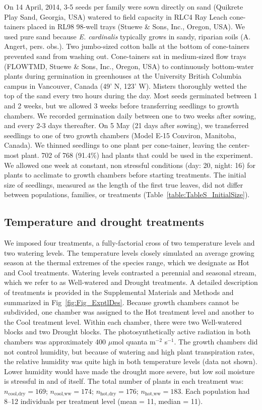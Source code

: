 \documentclass[11pt, oneside]{article}
\begin{document}
On 14 April, 2014, 3-5 seeds per family were sown directly on sand (Quikrete Play Sand, Georgia, USA) watered to field capacity in RLC4 Ray Leach cone-tainers placed in RL98 98-well trays (Stuewe \& Sons, Inc., Oregon, USA). We used pure sand because \textit{E. cardinalis} typically grows in sandy, riparian soils (A. Angert, pers. obs.). Two jumbo-sized cotton balls at the bottom of cone-tainers prevented sand from washing out. Cone-tainers sat in medium-sized flow trays (FLOWTMD, Stuewe \& Sons, Inc., Oregon, USA) to continuously bottom-water plants during germination in greenhouses at the University British Columbia campus in Vancouver, Canada (49' N, 123' W). Misters thoroughly wetted the top of the sand every two hours during the day. Most seeds germinated between 1 and 2 weeks, but we allowed 3 weeks before transferring seedlings to growth chambers. We recorded germination daily between one to two weeks after sowing, and every 2-3 days thereafter. On 5 May (21 days after sowing), we transferred seedlings to one of two growth chambers (Model E-15 Conviron, Manitoba, Canada). We thinned seedlings to one plant per cone-tainer, leaving the center-most plant. 702 of 768 (91.4\%) had plants that could be used in the experiment. We allowed one week at constant, non stressful conditions (day: 20\celsius, night: 16\celsius) for plants to acclimate to growth chambers before starting treatments. The initial size of seedlings, measured as the length of the first true leaves, did not differ between populations, families, or treatments (Table~\ref{table:TableS_InitialSize}).
    
\subsection*{Temperature and drought treatments}

We imposed four treatments, a fully-factorial cross of two temperature levels and two watering levels. The temperature levels closely simulated an average growing season at the thermal extremes of the species range, which we designate as Hot and Cool treatments. Watering levels contrasted a perennial and seasonal stream, which we refer to as Well-watered and Drought treatments. A detailed description of treatments is provided in the Supplemental Materials and Methods and summarized in Fig~\ref{fig:Fig_ExptlDes}. Because growth chambers cannot be subdivided, one chamber was assigned to the Hot treatment level and another to the Cool treatment level. Within each chamber, there were two Well-watered blocks and two Drought blocks. The photosynthetically active radiation in both chambers was approximately 400 $\mu$mol quanta m$^{-2}$ s$^{-1}$. The growth chambers did not control humidity, but because of watering and high plant transpiration rates, the relative humidity was quite high in both temperature levels (data not shown). Lower humidity would have made the drought more severe, but low soil moisture is stressful in and of itself. The total number of plants in each treatment was: $n_{\text{cool,dry}} = 169$; $n_{\text{cool,ww}} = 174$; $n_{\text{hot,dry}} = 176$; $n_{\text{hot,ww}} = 183$. Each population had 8--12 individuals per treatment level (mean = 11, median = 11).
\end{document}
